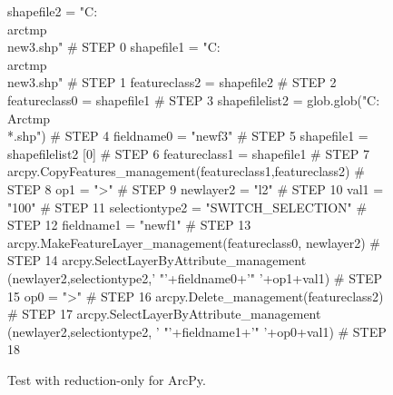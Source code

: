 \begin{figure}[t]
{\scriptsize 
\begin{code}
shapefile2 = "C:\\arctmp\\new3.shp"                               \# STEP 0 
shapefile1 = "C:\\arctmp\\new3.shp"                               \# STEP 1
featureclass2 = shapefile2                                      \# STEP 2
featureclass0 = shapefile1                                      \# STEP 3
shapefilelist2 = glob.glob("C:\\Arctmp\\*.shp")                   \# STEP 4
fieldname0 = "newf3"                                            \# STEP 5
shapefile1 = shapefilelist2 [0]                                 \# STEP 6
featureclass1 = shapefile1                                      \# STEP 7
arcpy.CopyFeatures\_management(featureclass1,featureclass2)     \# STEP 8
op1 = ">"                                                       \# STEP 9
newlayer2 = "l2"                                                  \# STEP 10
val1 = "100"                                                      \# STEP 11
selectiontype2 = "SWITCH\_SELECTION"                               \# STEP 12
fieldname1 = "newf1"                                              \# STEP 13
arcpy.MakeFeatureLayer\_management(featureclass0, newlayer2)   \# STEP 14
arcpy.SelectLayerByAttribute\_management
   (newlayer2,selectiontype2,' "'+fieldname0+'" '+op1+val1)   \# STEP 15
op0 = ">"                                                        \# STEP 16
arcpy.Delete\_management(featureclass2)                           \# STEP 17
arcpy.SelectLayerByAttribute\_management
   (newlayer2,selectiontype2, ' "'+fieldname1+'" '+op0+val1) \# STEP 18
\end{code}
}
\caption{Test with reduction-only for ArcPy.}
\label{esriorig}
\end{figure}

